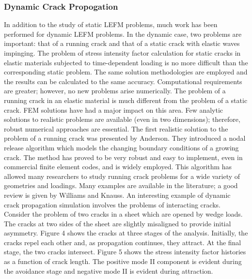 \documentclass[11pt]{article}
\begin{document}
\subsubsection{Dynamic Crack Propogation}
In addition to the study of static LEFM problems, much work has been performed for
dynamic LEFM problems. In the dynamic case, two problems are important: that of a running
crack and that of a static crack with elastic waves impinging. The problem of stress intensity factor
calculation for static cracks in elastic materials subjected to time-dependent loading is no more
difficult than the corresponding static problem. The same solution methodologies are employed and
the results can be calculated to the same accuracy. Computational requirements are greater;
however, no new problems arise numerically. The problem of a running crack in an elastic material
is much different from the problem of a static crack. FEM solutions have had a major impact on
this area. Few analytic solutions to realistic problems are available (even in two dimensions);
therefore, robust numerical approaches are essential. The first realistic solution to the problem of
a running crack was presented by Anderson. They introduced a nodal release algorithm
which models the changing boundary conditions of a growing crack. The method has proved to
be very robust and easy to implement, even in commercial finite element codes, and is widely
employed. This algorithm has allowed many researchers to study running crack problems for a wide
variety of geometries and loadings. Many examples are available in the literature; a good review
is given by Williams and Knauss. An interesting example of dynamic crack propagation
simulation involves the problems of interacting cracks. Consider the problem of two cracks in a
sheet which are opened by wedge loads. The cracks at two sides of the sheet are slightly
misaligned to provide initial asymmetry. Figure 4 shows the cracks at three stages of the analysis.
Initially, the cracks repel each other and, as propagation continues, they attract. At the final stage,
the two cracks intersect. Figure 5 shows the stress intensity factor histories as a function of crack
length. The positive mode II component is evident during the avoidance stage and negative mode
II is evident during attraction.
\end{document}
